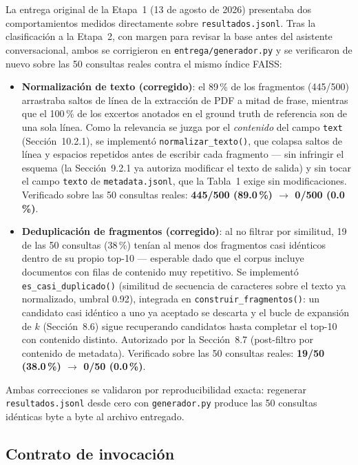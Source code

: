 \documentclass[11pt]{article}
\newcommand{\codigo}[1]{\texttt{\small #1}}
\begin{document}
La entrega original de la Etapa~1 (13 de agosto de 2026) presentaba dos
comportamientos medidos directamente sobre \codigo{resultados.jsonl}. Tras la
clasificación a la Etapa~2, con margen para revisar la base antes del
asistente conversacional, ambos se corrigieron en
\codigo{entrega/generador.py} y se verificaron de nuevo sobre las 50
consultas reales contra el mismo índice FAISS:

\begin{itemize}
\item \textbf{Normalización de texto (corregido)}: el 89\,\% de los
fragmentos (445/500) arrastraba saltos de línea de la extracción de PDF a
mitad de frase, mientras que el 100\,\% de los excertos anotados en el
ground truth de referencia son de una sola línea. Como la relevancia se
juzga por el \emph{contenido} del campo \codigo{text} (Sección~10.2.1), se
implementó \codigo{normalizar\_texto()}, que colapsa saltos de línea y
espacios repetidos antes de escribir cada fragmento --- sin infringir el
esquema (la Sección~9.2.1 ya autoriza modificar el texto de salida) y sin
tocar el campo \codigo{texto} de \codigo{metadata.jsonl}, que la Tabla~1
exige sin modificaciones. Verificado sobre las 50 consultas reales:
\textbf{445/500 (89.0\,\%) $\to$ 0/500 (0.0\,\%)}.
\item \textbf{Deduplicación de fragmentos (corregido)}: al no filtrar por
similitud, 19 de las 50 consultas (38\,\%) tenían al menos dos fragmentos
casi idénticos dentro de su propio top-10 --- esperable dado que el corpus
incluye documentos con filas de contenido muy repetitivo. Se implementó
\codigo{es\_casi\_duplicado()} (similitud de secuencia de caracteres sobre
el texto ya normalizado, umbral 0.92), integrada en
\codigo{construir\_fragmentos()}: un candidato casi idéntico a uno ya
aceptado se descarta y el bucle de expansión de $k$ (Sección~8.6) sigue
recuperando candidatos hasta completar el top-10 con contenido distinto.
Autorizado por la Sección~8.7 (post-filtro por contenido de metadata).
Verificado sobre las 50 consultas reales: \textbf{19/50 (38.0\,\%) $\to$
0/50 (0.0\,\%)}.
\end{itemize}

Ambas correcciones se validaron por reproducibilidad exacta: regenerar
\codigo{resultados.jsonl} desde cero con \codigo{generador.py} produce las
50 consultas idénticas byte a byte al archivo entregado.

\subsection{Contrato de invocación}
\end{document}
